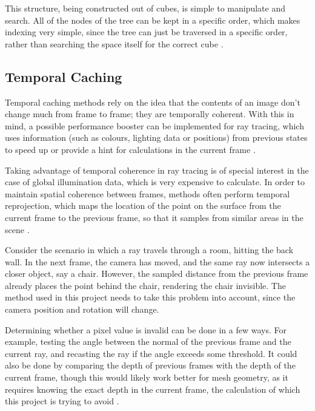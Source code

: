 This structure, being constructed out of cubes, is simple to manipulate and search. All of the nodes of the tree can be kept in a specific order, which makes indexing very simple, since the tree can just be traversed in a specific order, rather than searching the space itself for the correct cube \cite{meagher1982geometric}.

\subsection{Temporal Caching} \label{section:temporal-caching}

Temporal caching methods rely on the idea that the contents of an image don't change much from frame to frame; they are temporally coherent. With this in mind, a possible performance booster can be implemented for ray tracing, which uses information (such as colours, lighting data or positions) from previous states to speed up or provide a hint for calculations in the current frame \cite{cosenza2008estimating}.\newline

Taking advantage of temporal coherence in ray tracing is of special interest in the case of global illumination data, which is very expensive to calculate. In order to maintain spatial coherence between frames, methods often perform temporal reprojection, which maps the location of the point on the surface from the current frame to the previous frame, so that it samples from similar areas in the scene \cite{scherzer2012temporal}.\newline

Consider the scenario in which a ray travels through a room, hitting the back wall. In the next frame, the camera has moved, and the same ray now intersects a closer object, say a chair. However, the sampled distance from the previous frame already places the point behind the chair, rendering the chair invisible. The method used in this project needs to take this problem into account, since the camera position and rotation will change.\newline

Determining whether a pixel value is invalid can be done in a few ways. For example, testing the angle between the normal of the previous frame and the current ray, and recasting the ray if the angle exceeds some threshold. It could also be done by comparing the depth of previous frames with the depth of the current frame, though this would likely work better for mesh geometry, as it requires knowing the exact depth in the current frame, the calculation of which this project is trying to avoid \cite{weier2016foveated}.

